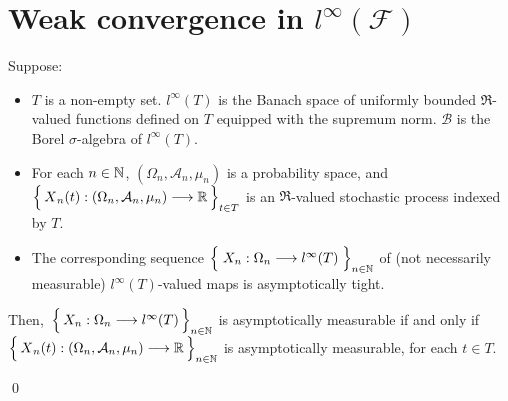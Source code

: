 

\section{Weak convergence in $l^{\infty}(\mathcal{F})$}
\setcounter{theorem}{0}
\setcounter{equation}{0}


\renewcommand{\theenumi}{\roman{enumi}}
\renewcommand{\labelenumi}{\textnormal{(\theenumi)}$\;\;$}


\begin{lemma}
\mbox{}\vskip 0.1cm
\noindent
Suppose:
\begin{itemize}
\item
	$T$ is a non-empty set.
	$l^{\infty}(T)$ is the Banach space of uniformly bounded $\Re$-valued functions defined on $T$
	equipped with the supremum norm.
	$\mathcal{B}$ is the Borel $\sigma$-algebra of $l^{\infty}(T)$.
\item
	For each $n\in\mathbb{N}$, $(\Omega_{n},\mathcal{A}_{n},\mu_{n})$ is a probability space, and
	\,$\left\{\,\overset{{\color{white}.}}{X}_{n}(t):(\Omega_{n},\mathcal{A}_{n},\mu_{n})\longrightarrow\Re\,\right\}_{t\in T}$
	is an $\Re$-valued stochastic process indexed by $T$.
\item
	The corresponding sequence
	$\left\{\;
		X_{n} : \Omega_{n}
		\overset{{\color{white}-}}{\longrightarrow}
		l^{\infty}(T)\;\right\}_{n\in\N}$
	of (not necessarily measurable) $l^{\infty}(T)$-valued maps
	is asymptotically tight.
\end{itemize}
Then,
\,$\left\{\,X_{n} : \Omega_{n}\overset{{\color{white}-}}{\longrightarrow}l^{\infty}(T)\,\right\}_{n\in\N}$
is asymptotically measurable if and only if
\,$\left\{\,\overset{{\color{white}.}}{X}_{n}(t) : (\Omega_{n},\mathcal{A}_{n},\mu_{n}) \longrightarrow \Re\,\right\}_{n\in\N}$
is asymptotically measurable, for each $t \in T$.
\end{lemma}
\proof
\qed


